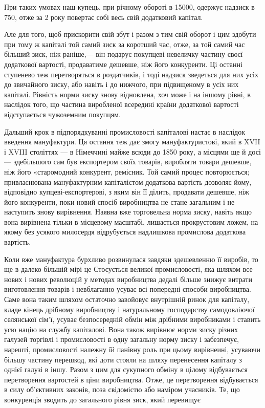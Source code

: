 \parcont{}  %
При таких умовах наш купець, при річному
обороті в 15000, одержує надзиск в 750, отже за 2 року повертає собі весь свій додатковий капітал.

Але для того, щоб
прискорити свій збут і разом з тим свій оборот і цим здобути при тому ж капіталі той самий зиск за коротший час, отже, за
той самий час більший зиск, ніж раніше,— він подарує покупцеві невеличку частину своєї додаткової вартості, продаватиме
дешевше, ніж його конкуренти.
Ці останні ступенево теж перетворяться в роздатчиків, і тоді надзиск зведеться для них усіх до звичайного зиску, або навіть і
до нижчого, при підвищеному в усіх них капіталі. Рівність норми зиску знову відновлена, хоч може і на іншому рівні, в
наслідок того, що частина виробленої всередині країни додаткової вартості відступається чужоземним покупцям.

Дальший крок в
підпорядкуванні промисловості капіталові настає в наслідок введення мануфактури. Ця остання теж дає змогу мануфактуристові,
який в XVII і XVIII століттях — в Німеччині майже всюди до 1850 року, а місцями ще й досі — здебільшого сам був експортером
своїх товарів, виробляти товари дешевше, ніж його «старомодний конкурент, ремісник. Той самий процес повторюється;
привласнювана мануфактурним капіталістом додаткова вартість дозволяє йому, відповідно купцеві-експортерові, з яким він її
ділить, продавати дешевше, ніж його конкуренти, поки новий спосіб виробництва не стане загальним і не наступить знову
вирівнення. Наявна вже торговельна норма зиску, навіть якщо вона вирівнена тільки в місцевому масштабі, лишається
прокрустовим ложем, на якому без усякого милосердя відрубується надлишкова промислова додаткова вартість.

Коли вже мануфактура бурхливо розвинулася завдяки здешевленню її виробів, то ще в далеко більшій мірі це Стосується великої
промисловості, яка шляхом все нових і нових революцій у методах виробництва дедалі більше знижує витрати виготовлення
товарів і невблаганно усуває всі попередні способи виробництва. Саме вона таким шляхом остаточно завойовує внутрішній ринок
для капіталу, кладе кінець дрібному виробництву і натуральному господарству самодовліючої селянської сім’ї, усуває
безпосередній обмін між дрібними виробниками і ставить усю націю на службу капіталові. Вона також вирівнює норми зиску
різних галузей торгівлі і промисловості в одну загальну норму зиску і забезпечує, нарешті, промисловості належну їй панівну
роль при цьому вирівнеині, усуваючи більшу частину перешкод, які доти стояли на шляху перенесення капіталу з однієї галузі в
іншу. Разом з цим для сукупного обміну в цілому відбувається перетворення вартостей в ціни виробництва. Отже, це
перетворення відбувається в силу об’єктивних законів, поза свідомістю або наміром учасників. Те, що конкуренція зводить до
загального рівня зиск, який перевищує
\parbreak{}  %
